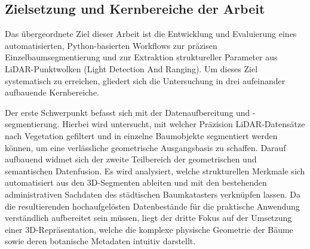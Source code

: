 \subsection{Zielsetzung und Kernbereiche der Arbeit}

Das übergeordnete Ziel dieser Arbeit ist die Entwicklung und Evaluierung eines automatisierten, Python-basierten Workflows zur präzisen Einzelbaumsegmentierung und zur Extraktion struktureller Parameter aus \ac{LiDAR}-Punktwolken (Light Detection And Ranging). Um dieses Ziel systematisch zu erreichen, gliedert sich die Untersuchung in drei aufeinander aufbauende Kernbereiche.

Der erste Schwerpunkt befasst sich mit der Datenaufbereitung und -segmentierung. Hierbei wird untersucht, mit welcher Präzision LiDAR-Datensätze nach Vegetation gefiltert und in einzelne Baumobjekte segmentiert werden können, um eine verlässliche geometrische Ausgangsbasis zu schaffen. Darauf aufbauend widmet sich der zweite Teilbereich der geometrischen und semantischen Datenfusion. Es wird analysiert, welche strukturellen Merkmale sich automatisiert aus den 3D-Segmenten ableiten und mit den bestehenden administrativen Sachdaten des städtischen Baumkatasters verknüpfen lassen. Da die resultierenden hochaufgelösten Datenbestände für die praktische Anwendung verständlich aufbereitet sein müssen, liegt der dritte Fokus auf der Umsetzung einer 3D-Repräsentation, welche die komplexe physische Geometrie der Bäume sowie deren botanische Metadaten intuitiv darstellt.